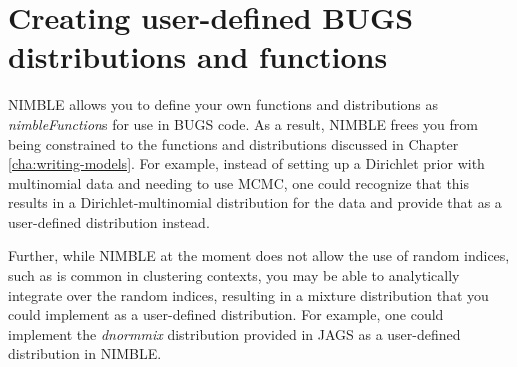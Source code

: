 \documentclass[12pt,oneside]{book}\usepackage[]{graphicx}\usepackage[]{color}
\def\cd#1{\texttt{#1}}
\def\nm#1{\textit{#1}}
\begin{document}
  

  
    









\chapter{Creating user-defined BUGS distributions and functions}
\label{cha:user-defined}


NIMBLE allows you to define your own functions and distributions as \nm{nimbleFunction}s for use in BUGS code. As a result, NIMBLE frees you from being constrained to the functions and distributions discussed in Chapter \ref{cha:writing-models}.  For example, instead of setting up a Dirichlet prior with multinomial data and needing to use MCMC, one could recognize that this results in a Dirichlet-multinomial distribution for the data and provide that as a user-defined distribution instead.

Further, while NIMBLE at the moment does not allow the use of random
indices, such as is common in clustering contexts, you may be able to
analytically integrate over the random indices, resulting in a mixture
distribution that you could implement as a user-defined distribution.
For example, one could implement the \nm{dnormmix} distribution
provided in JAGS as a user-defined distribution in NIMBLE.
\end{document}
